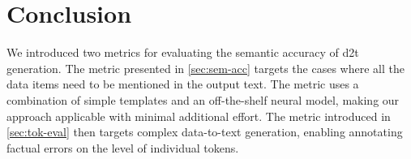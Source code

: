 \section{Conclusion}
We introduced two metrics for evaluating the semantic accuracy of \ac{d2t} generation. The metric presented in \autoref{sec:sem-acc} targets the cases where all the data items need to be mentioned in the output text. The metric uses a combination of simple templates and an off-the-shelf neural model, making our approach applicable with minimal additional effort. The metric introduced in \autoref{sec:tok-eval} then targets complex data-to-text generation, enabling annotating factual errors on the level of individual tokens.